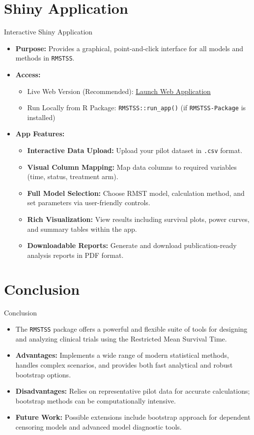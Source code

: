 \documentclass{beamer}
\begin{document}
\section*{Shiny Application}
\begin{frame}{Interactive Shiny Application}
\begin{itemize}
    \item \textbf{Purpose:} Provides a graphical, point-and-click interface for all models and methods in \texttt{RMSTSS}.
    \item \textbf{Access:}
    \begin{itemize}
        \item Live Web Version (Recommended): \href{https://arnab96.shinyapps.io/uthsc-app/}{Launch Web Application}
        \item Run Locally from R Package: \texttt{RMSTSS::run\_app()} (if \texttt{RMSTSS-Package} is installed)
    \end{itemize}
    \item \textbf{App Features:}
    \begin{itemize}
        \item \textbf{Interactive Data Upload:} Upload your pilot dataset in \texttt{.csv} format.
        \item \textbf{Visual Column Mapping:} Map data columns to required variables (time, status, treatment arm).
        \item \textbf{Full Model Selection:} Choose RMST model, calculation method, and set parameters via user-friendly controls.
        \item \textbf{Rich Visualization:} View results including survival plots, power curves, and summary tables within the app.
        \item \textbf{Downloadable Reports:} Generate and download publication-ready analysis reports in PDF format.
    \end{itemize}
\end{itemize}
\end{frame}

\section*{Conclusion}
\begin{frame}{Conclusion}
\begin{itemize}
    \item The \texttt{RMSTSS} package offers a powerful and flexible suite of tools for designing and analyzing clinical trials using the Restricted Mean Survival Time.
    \item \textbf{Advantages:} Implements a wide range of modern statistical methods, handles complex scenarios, and provides both fast analytical and robust bootstrap options.
    \item \textbf{Disadvantages:} Relies on representative pilot data for accurate calculations; bootstrap methods can be computationally intensive.
    \item \textbf{Future Work:} Possible extensions include bootstrap approach for dependent censoring models and advanced model diagnostic tools.
\end{itemize}
\end{frame}
\end{document}
